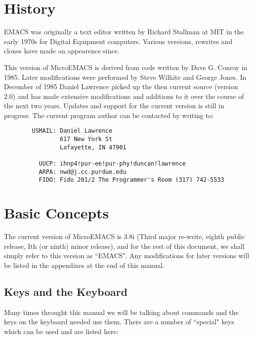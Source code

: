 \chapter*{History}

EMACS was originally a text editor written by Richard Stallman
at MIT in the early 1970s for Digital Equipment computers. Various
versions, rewrites and clones have made an appearence since.

This version of MicroEMACS is derived from code written by Dave
G.  Conroy in 1985.  Later modifications were performed by Steve Wilhite
and George Jones.  In December of 1985 Daniel Lawrence picked up the
then current source (version 2.0) and has made extensive modifications
and additions to it over the course of the next two years.  Updates and
support for the current version is still in progress.  The current
program author can be contacted by writing to:

\begin{verbatim}
        USMAIL: Daniel Lawrence
                617 New York St
                Lafayette, IN 47901

          UUCP: ihnp4!pur-ee!pur-phy!duncan!lawrence
          ARPA: nwd@j.cc.purdue.edu
          FIDO: Fido 201/2 The Programmer's Room (317) 742-5533
\end{verbatim}
\chapter{Basic Concepts}

The current version of MicroEMACS is 3.8i (Third major re-write,
eighth public release, Ith (or ninth) minor release), and for the rest of
this document, we shall simply refer to this version as ``EMACS".  Any
modifications for later versions will be listed in the appendixes at the
end of this manual.

\section{Keys and the Keyboard}

Many times throught this manual we will be talking about
 commands and the keys on the keyboard needed use
them.  There are a number of ``special" keys which can be used and are
listed here:

